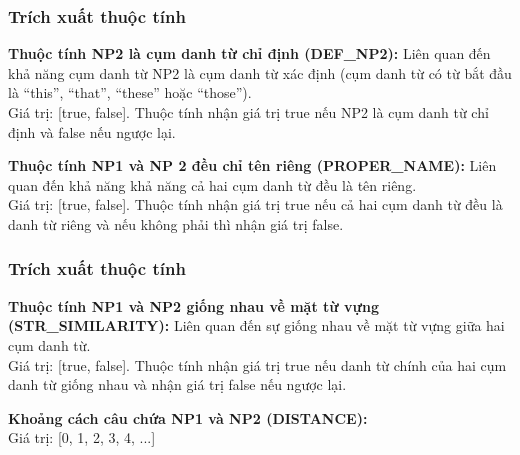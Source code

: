 \documentclass{beamer}
\begin{document}
\begin{frame}
\frametitle{Trích xuất thuộc tính}

\begin{block}{}
\textbf{Thuộc tính NP2 là cụm danh từ chỉ định (DEF\_NP2):} Liên quan đến khả năng cụm danh từ NP2 là cụm danh từ xác định (cụm danh từ có từ bắt đầu là “this”, “that”, “these” hoặc “those”).
\\Giá trị: [true, false]. Thuộc tính nhận giá trị true nếu NP2 là cụm danh từ chỉ định và false nếu ngược lại.
\end{block}

\begin{block}{}
\textbf{Thuộc tính NP1 và NP 2 đều chỉ tên riêng (PROPER\_NAME):} Liên quan đến khả năng khả năng cả hai cụm danh từ đều là tên riêng.
\\Giá trị: [true, false]. Thuộc tính nhận giá trị true nếu cả hai cụm danh từ đều là danh từ riêng và nếu không phải thì nhận giá trị false.
\end{block}

\end{frame}

\begin{frame}
\frametitle{Trích xuất thuộc tính}

\begin{block}{}
\textbf{Thuộc tính NP1 và NP2 giống nhau về mặt từ vựng (STR\_SIMILARITY):} Liên quan đến sự giống nhau về mặt từ vựng giữa hai cụm danh từ.
\\Giá trị: [true, false]. Thuộc tính nhận giá trị true nếu danh từ chính của hai cụm danh từ giống nhau và nhận giá trị false nếu ngược lại.
\end{block}

\begin{block}{}
\textbf{Khoảng cách câu chứa NP1 và NP2 (DISTANCE):}
\\Giá trị: [0, 1, 2, 3, 4, ...]
\end{block}

\end{frame}
\end{document}
